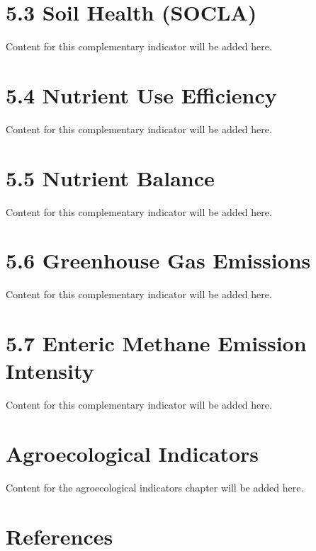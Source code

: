 \documentclass[
  letterpaper,
  DIV=11,
  numbers=noendperiod]{scrreprt}
\begin{document}
\chapter{5.3 Soil Health (SOCLA)}\label{soil-health-socla}

Content for this complementary indicator will be added here.

\chapter{5.4 Nutrient Use Efficiency}\label{nutrient-use-efficiency}

Content for this complementary indicator will be added here.

\chapter{5.5 Nutrient Balance}\label{nutrient-balance}

Content for this complementary indicator will be added here.

\chapter{5.6 Greenhouse Gas Emissions}\label{greenhouse-gas-emissions}

Content for this complementary indicator will be added here.

\chapter{5.7 Enteric Methane Emission
Intensity}\label{enteric-methane-emission-intensity}

Content for this complementary indicator will be added here.


\chapter{Agroecological Indicators}\label{agroecological-indicators}

Content for the agroecological indicators chapter will be added here.


\chapter*{References}\label{references-4}


\label{refs}
\end{document}
